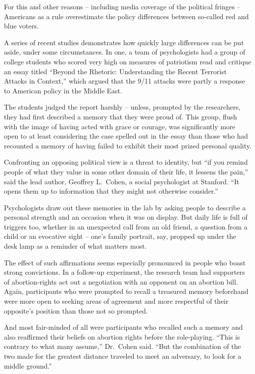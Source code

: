 ﻿\documentclass[12pt]{article}
\begin{document}
For this and other reasons -- including media coverage of the political fringes -- Americans as a
rule overestimate the policy differences between so-called red and blue voters.

A series of recent studies demonstrates how quickly large differences can be put aside, under some
circumstances. In one, a team of psychologists had a group of college students who scored very high
on measures of patriotism read and critique an essay titled ``Beyond the Rhetoric: Understanding the
Recent Terrorist Attacks in Context,'' which argued that the 9/11 attacks were partly a response to
American policy in the Middle East.

The students judged the report harshly -- unless, prompted by the researchers, they had first
described a memory that they were proud of. This group, flush with the image of having acted with
grace or courage, was significantly more open to at least considering the case spelled out in the
essay than those who had recounted a memory of having failed to exhibit their most prized personal
quality.

Confronting an opposing political view is a threat to identity, but ``if you remind people of what
they value in some other domain of their life, it lessens the pain,'' said the lead author, Geoffrey
L.~Cohen, a social psychologist at Stanford. ``It opens them up to information that they might not
otherwise consider.''

Psychologists draw out these memories in the lab by asking people to describe a personal strength
and an occasion when it was on display. But daily life is full of triggers too, whether in an
unexpected call from an old friend, a question from a child or an evocative sight -- one's family
portrait, say, propped up under the desk lamp as a reminder of what matters most.

The effect of such affirmations seems especially pronounced in people who boast strong convictions.
In a follow-up experiment, the research team had supporters of abortion-rights act out a negotiation
with an opponent on an abortion bill. Again, participants who were prompted to recall a treasured
memory beforehand were more open to seeking areas of agreement and more respectful of their
opposite's position than those not so prompted.

And most fair-minded of all were participants who recalled such a memory and also reaffirmed their
beliefs on abortion rights before the role-playing. ``This is contrary to what many assume,''
Dr.~Cohen said. ``But the combination of the two made for the greatest distance traveled to meet an
adversary, to look for a middle ground.''
\end{document}
